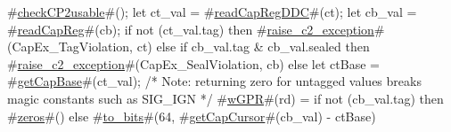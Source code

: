 #\hyperref[sailMIPSzcheckCP2usable]{checkCP2usable}#();
let ct_val = #\hyperref[sailMIPSzreadCapRegDDC]{readCapRegDDC}#(ct);
let cb_val = #\hyperref[sailMIPSzreadCapReg]{readCapReg}#(cb);
if not (ct_val.tag) then
  #\hyperref[sailMIPSzraisezyc2zyexception]{raise\_c2\_exception}#(CapEx_TagViolation, ct)
else if cb_val.tag & cb_val.sealed then
  #\hyperref[sailMIPSzraisezyc2zyexception]{raise\_c2\_exception}#(CapEx_SealViolation, cb)
else
{
  let ctBase = #\hyperref[sailMIPSzgetCapBase]{getCapBase}#(ct_val);
  /* Note: returning zero for untagged values breaks magic constants such as SIG_IGN */
  #\hyperref[sailMIPSzwGPR]{wGPR}#(rd) = if not (cb_val.tag) then
      #\hyperref[sailMIPSzzzeros]{zeros}#()
    else
      #\hyperref[sailMIPSztozybits]{to\_bits}#(64, #\hyperref[sailMIPSzgetCapCursor]{getCapCursor}#(cb_val) - ctBase)
}
